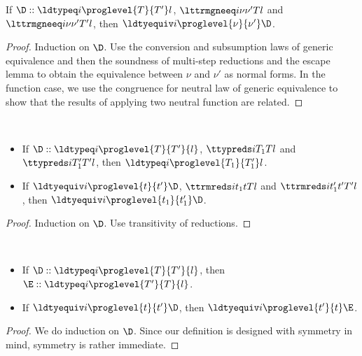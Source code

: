 \begin{lemma}
  If $\D :: \ldtypeq i \proglevel{T}{T'}l$, $\lttrmgneeq i \nu{\nu'} T l$ and $\lttrmgneeq i \nu{\nu'}{T'} l$, then $\ldtyequiv i \proglevel{\nu}{\nu'}\D$.
\end{lemma}
\begin{proof}
  Induction on $\D$. %
  Use the conversion and subsumption laws of generic equivalence and then the
  soundness of multi-step reductions and the escape lemma to obtain the equivalence
  between $\nu$ and $\nu'$ as normal forms. %
  In the function case, we use the congruence for neutral law of generic equivalence
  to show that the results of applying two neutral function are related.
\end{proof}

\begin{lemma} $ $
  \begin{itemize}
  \item If $\D :: \ldtypeq i \proglevel{T}{T'}{l}$, $\ttypreds i{T_1} T l$ and $\ttypreds
    i{T_1'}{T'}l$, then \newline $\ldtypeq i \proglevel {T_1}{T_1'} l$.
  \item If $\ldtyequiv i \proglevel{t}{t'}\D$, $\ttrmreds i{t_1}{t}{T} l$ and $\ttrmreds
    i{t_1'}{t'}{T'}l$, then $\ldtyequiv i \proglevel {t_1}{t_1'} \D$.
  \end{itemize}  
\end{lemma}
\begin{proof}
  Induction on $\D$. Use transitivity of reductions. 
\end{proof}

\begin{lemma}[Symmetry] $ $
  \begin{itemize}
  \item If $\D :: \ldtypeq i \proglevel{T}{T'}{l}$, then $\E :: \ldtypeq i \proglevel{T'}{T}{l}$.
  \item If $\ldtyequiv i \proglevel{t}{t'}\D$, then $\ldtyequiv i \proglevel{t'}{t}\E$. 
  \end{itemize}
\end{lemma}
\begin{proof}
  We do induction on $\D$. %
  Since our definition is designed with symmetry in mind, symmetry is rather immediate.
\end{proof}


